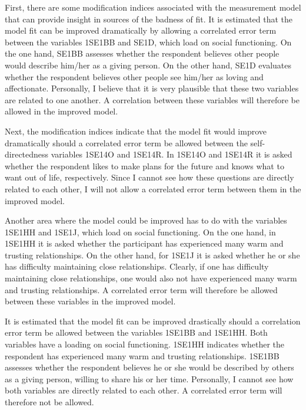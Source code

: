 \documentclass[11pt]{article}
\begin{document}
First, there are some modification indices associated with the measurement model that can provide insight in sources of the badness of fit.
It is estimated that the model fit can be improved dramatically by allowing a correlated error term between the variables 1SE1BB and SE1D, which load on social functioning.
On the one hand, SE1BB assesses whether the respondent believes other people would describe him/her as a giving person.
On the other hand, SE1D evaluates whether the respondent believes other people see him/her as loving and affectionate.
Personally, I believe that it is very plausible that these two variables are related to one another.
A correlation between these variables will therefore be allowed in the improved model.

Next, the modification indices indicate that the model fit would improve dramatically should a correlated error term be allowed between the self-directedness variables 1SE14O and 1SE14R.
In 1SE14O and 1SE14R it is asked whether the respondent likes to make plans for the future and knows what to want out of life, respectively. 
Since I cannot see how these questions are directly related to each other, I will not allow a correlated error term between them in the improved model.

Another area where the model could be improved has to do with the variables 1SE1HH and 1SE1J, which load on social functioning.
On the one hand, in 1SE1HH it is asked whether the participant has experienced many warm and trusting relationships.
On the other hand, for 1SE1J it is asked whether he or she has difficulty maintaining close relationships.
Clearly, if one has difficulty maintaining close relationships, one would also not have experienced many warm and trusting relationships.
A correlated error term will therefore be allowed between these variables in the improved model.

It is estimated that the model fit can be improved drastically should a correlation error term be allowed between the variables 1SE1BB and 1SE1HH.
Both variables have a loading on social functioning.
1SE1HH indicates whether the respondent has experienced many warm and trusting relationships.
1SE1BB assesses whether the respondent believes he or she would be described by others as a giving person, willing to share his or her time.
Personally, I cannot see how both variables are directly related to each other.
A correlated error term will therefore not be allowed.
\end{document}
